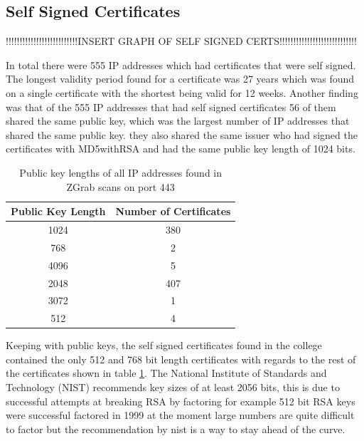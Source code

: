 \documentclass[a4wide,leqno,12pt]{report}
\begin{document}
\subsection{Self Signed Certificates}

!!!!!!!!!!!!!!!!!!!!!!!!!!INSERT GRAPH OF SELF SIGNED CERTS!!!!!!!!!!!!!!!!!!!!!!!!!!!!

In total there were 555 IP addresses which had certificates that were self signed. The longest validity period found for a certificate was 27 years which was found on a single certificate with the shortest being valid for 12 weeks. Another finding was that of the 555 IP addresses that had self signed certificates 56 of them shared the same public key, which was the largest number of IP addresses that shared the same public key. they also shared the same issuer who had signed the certificates with MD5withRSA and had the same public key length of 1024 bits.


\begin{table}[H]
\centering
\begin{tabular}{||c c  ||}
 \hline
Public Key Length  & Number of Certificates\\ [0.5ex]
 \hline\hline
1024 & 380\\
768	& 2\\
4096 &	5\\
2048 &407\\
3072 & 1\\
512	& 4\\[1ex]

 \hline
\end{tabular}
\caption{Public key lengths of all IP addresses found in ZGrab scans on port 443}
\label{table:public_key_lengths}
\end{table}
Keeping with public keys, the self signed certificates found in the college contained the only 512 and 768 bit length certificates with regards to the rest of the certificates shown in table \ref{table:public_key_lengths}. The National Institute of Standards and Technology (NIST) recommends key sizes of at least 2056 bits, \cite{barker2015recommendation} this is due to successful attempts at breaking RSA by factoring for example 512 bit RSA keys were successful factored in 1999 \cite{kaliski2011rsa} at the moment large numbers are quite difficult to factor but the recommendation by nist is a way to stay ahead of the curve.
\end{document}
